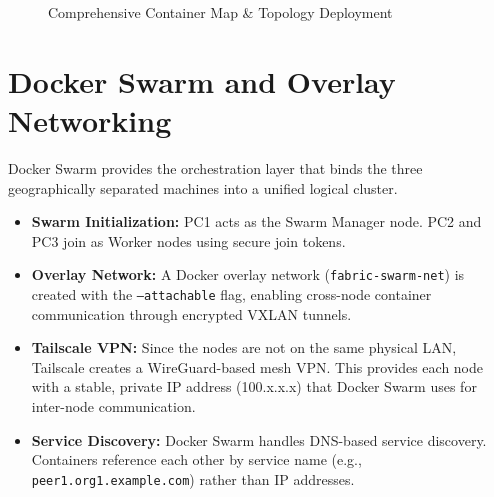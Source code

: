 \begin{landscape}
\begin{figure}[p]
    \caption{Comprehensive Container Map \& Topology Deployment}
    \label{fig:complex_arch}
\end{figure}
\end{landscape}

\section{Docker Swarm and Overlay Networking}

Docker Swarm provides the orchestration layer that binds the three geographically separated machines into a unified logical cluster.

\begin{itemize}
    \item \textbf{Swarm Initialization:} PC1 acts as the Swarm Manager node. PC2 and PC3 join as Worker nodes using secure join tokens.
    \item \textbf{Overlay Network:} A Docker overlay network (\texttt{fabric-swarm-net}) is created with the \texttt{--attachable} flag, enabling cross-node container communication through encrypted VXLAN tunnels.
    \item \textbf{Tailscale VPN:} Since the nodes are not on the same physical LAN, Tailscale creates a WireGuard-based mesh VPN. This provides each node with a stable, private IP address (100.x.x.x) that Docker Swarm uses for inter-node communication.
    \item \textbf{Service Discovery:} Docker Swarm handles DNS-based service discovery. Containers reference each other by service name (e.g., \texttt{peer1.org1.example.com}) rather than IP addresses.
\end{itemize}

